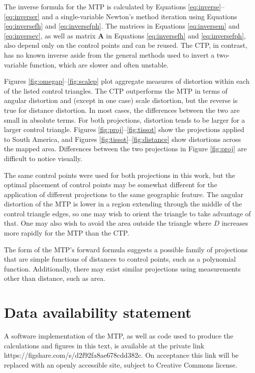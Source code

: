 \documentclass[]{interact}
\begin{document}
The inverse formula for the MTP is calculated by Equations
\ref{eq:inverse}--\ref{eq:inverser} and a single-variable Newton's method
iteration using Equations \ref{eq:inversefh} and \ref{eq:inversefph}. The
matrices in Equations \ref{eq:inversem} and \ref{eq:inversev}, as well
as matrix $\mathbf A$ in Equations \ref{eq:inversefh} and \ref{eq:inversefph},
also depend only on the control points and can be reused. The CTP,
in contrast, has no known inverse aside from the general methods used to invert
a two-variable function, which are slower and often unstable.

Figures \ref{fig:omegap}--\ref{fig:scalep} plot aggregate measures of distortion
within each of the listed control triangles. The CTP outperforms the MTP in
terms of angular distortion and (except in one case) scale distortion, but the
reverse is true for distance distortion. In most cases, the differences between
the two are small in absolute terms. For both projections, distortion tends to
be larger for a larger control triangle.
Figures \ref{fig:proj}--\ref{fig:tissot} show the projections applied to South
America, and Figures \ref{fig:tissot}--\ref{fig:distance} show distortions
across the mapped area. Differences between the two projections in
Figure \ref{fig:proj} are difficult to notice visually.

The same control points were used for both projections in this work, but the
optimal placement of control points may be somewhat different for the
application of different projections to the same geographic feature. The
angular distortion of the MTP is lower in a region extending through the middle
of the control triangle edges, so one may wish to orient the triangle to take
advantage of that. One may also wish to avoid the area outside the triangle
where $D$ increases more rapidly for the MTP than the CTP.

The form of the MTP's forward formula suggests a possible family of projections
that are simple functions of distances to control points, such as a polynomial
function. Additionally, there may exist similar projections using measurements
other than distance, such as area.

\section{Data availability statement}
A software implementation of the MTP, as well as code used to
produce the calculations and figures in this text,
is available at the private link https://figshare.com/s/d2f92fa8ae678cdd382c.
On acceptance this link will be replaced with an openly accessible site,
subject to Creative Commons license.
\end{document}
